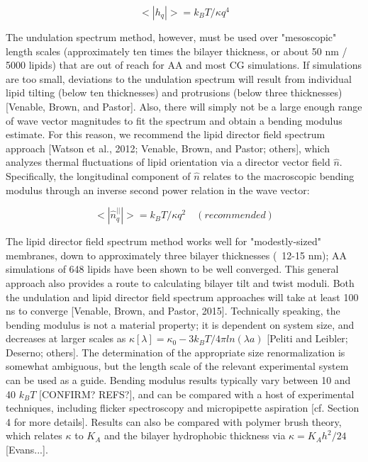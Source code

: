 \documentclass[9pt,bestpractices]{livecoms}
\begin{document}
\begin{equation}
	\label{e:partition}
	<|h_q|> = k_BT/\kappa q^4
\end{equation}

The undulation spectrum method, however, must be used over "mesoscopic" length scales (approximately ten times the bilayer thickness, or about 50 nm / 5000 lipids) that are out of reach for AA and most CG simulations.
If simulations are too small, deviations to the undulation spectrum will result from individual lipid tilting (below ten thicknesses) and protrusions (below three thicknesses) [Venable, Brown, and Pastor].
Also, there will simply not be a large enough range of wave vector magnitudes to fit the spectrum and obtain a bending modulus estimate.
For this reason, we recommend the lipid director field spectrum approach [Watson et al., 2012; Venable, Brown, and Pastor; others], which analyzes thermal fluctuations of lipid orientation via a director vector field $\hat{n}$.
Specifically, the longitudinal component of $\hat{n}$ relates to the macroscopic bending modulus through an inverse second power relation in the wave vector:

\begin{equation}
	\label{e:partition}
	<|\hat{n}_q^{||}|> = k_BT/\kappa q^2 \quad (recommended)
\end{equation}

The lipid director field spectrum method works well for "modestly-sized" membranes, down to approximately three bilayer thicknesses (~12-15 nm); AA simulations of 648 lipids have been shown to be well converged.
This general approach also provides a route to calculating bilayer tilt and twist moduli.
Both the undulation and lipid director field spectrum approaches will take at least 100 ns to converge [Venable, Brown, and Pastor, 2015].
Technically speaking, the bending modulus is not a material property; it is dependent on system size, and decreases at larger scales as $\kappa[\lambda] = \kappa _0 - 3k_BT/4\pi ln(\lambda a)$ [Peliti and Leibler; Deserno; others].
The determination of the appropriate size renormalization is somewhat ambiguous, but the length scale of the relevant experimental system can be used as a guide.
Bending modulus results typically vary between 10 and 40 $k_BT$ [CONFIRM? REFS?], and can be compared with a host of experimental techniques, including flicker spectroscopy and micropipette aspiration [cf. Section 4 for more details].
Results can also be compared with polymer brush theory, which relates $\kappa$ to $K_A$ and the bilayer hydrophobic thickness via $\kappa = K_Ah^2/24$ [Evans...].
\end{document}
